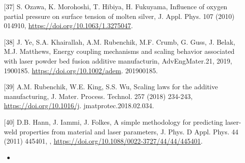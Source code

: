 \documentclass[10pt]{article}
\begin{document}
[37] S. Ozawa, K. Morohoshi, T. Hibiya, H. Fukuyama, Influence of oxygen partial pressure on surface tension of molten silver, J. Appl. Phys. 107 (2010) 014910, \href{https://doi.org/10.1063/1.3275047}{https://doi.org/10.1063/1.3275047}.

[38] J. Ye, S.A. Khairallah, A.M. Rubenchik, M.F. Crumb, G. Guss, J. Belak, M.J. Matthews, Energy coupling mechanisms and scaling behavior associated with laser powder bed fusion additive manufacturin, AdvEngMater.21, 2019, 1900185. \href{https://doi.org/10.1002/adem}{https://doi.org/10.1002/adem}. 201900185.

[39] A.M. Rubenchik, W.E. King, S.S. Wu, Scaling laws for the additive manufacturing, J. Mater. Process. Technol. 257 (2018) 234-243, \href{https://doi.org/10.1016/j}{https://doi.org/10.1016/j}. jmatprotec.2018.02.034.

[40] D.B. Hann, J. Iammi, J. Folkes, A simple methodology for predicting laser-weld properties from material and laser parameters, J. Phys. D Appl. Phys. 44 (2011) 445401, , \href{https://doi.org/10.1088/0022-3727/44/44/445401}{https://doi.org/10.1088/0022-3727/44/44/445401}.

\begin{itemize}
  \item 
\end{itemize}
\end{document}

